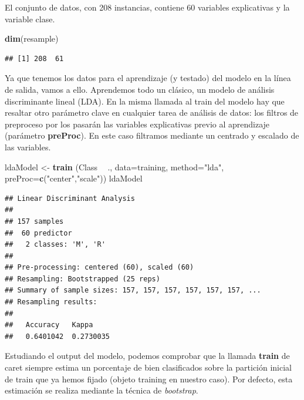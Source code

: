 \documentclass[
]{article}
\newenvironment{Shaded}{\begin{snugshade}}{\end{snugshade}}
\newcommand{\DataTypeTok}[1]{\textcolor[rgb]{0.13,0.29,0.53}{#1}}
\newcommand{\KeywordTok}[1]{\textcolor[rgb]{0.13,0.29,0.53}{\textbf{#1}}}
\newcommand{\NormalTok}[1]{#1}
\newcommand{\OperatorTok}[1]{\textcolor[rgb]{0.81,0.36,0.00}{\textbf{#1}}}
\newcommand{\StringTok}[1]{\textcolor[rgb]{0.31,0.60,0.02}{#1}}
\begin{document}
El conjunto de datos, con 208 instancias, contiene 60 variables
explicativas y la variable clase.

\begin{Shaded}
\begin{Highlighting}[]
\KeywordTok{dim}\NormalTok{(resample)}
\end{Highlighting}
\end{Shaded}

\begin{verbatim}
## [1] 208  61
\end{verbatim}

Ya que tenemos los datos para el aprendizaje (y testado) del modelo en
la línea de salida, vamos a ello. Aprendemos todo un clásico, un modelo
de análisis discriminante lineal (LDA). En la misma llamada al train del
modelo hay que resaltar otro parámetro clave en cualquier tarea de
análisis de datos: los filtros de preproceso por los pasarán las
variables explicativas previo al aprendizaje (parámetro
\textbf{preProc}). En este caso filtramos mediante un centrado y
escalado de las variables.

\begin{Shaded}
\begin{Highlighting}[]
\NormalTok{ldaModel <-}\StringTok{ }\KeywordTok{train}\NormalTok{ (Class }\OperatorTok{~}\StringTok{ }\NormalTok{., }\DataTypeTok{data=}\NormalTok{training, }\DataTypeTok{method=}\StringTok{"lda"}\NormalTok{, }\DataTypeTok{preProc=}\KeywordTok{c}\NormalTok{(}\StringTok{"center"}\NormalTok{,}\StringTok{"scale"}\NormalTok{))}
\NormalTok{ldaModel}
\end{Highlighting}
\end{Shaded}

\begin{verbatim}
## Linear Discriminant Analysis 
## 
## 157 samples
##  60 predictor
##   2 classes: 'M', 'R' 
## 
## Pre-processing: centered (60), scaled (60) 
## Resampling: Bootstrapped (25 reps) 
## Summary of sample sizes: 157, 157, 157, 157, 157, 157, ... 
## Resampling results:
## 
##   Accuracy   Kappa    
##   0.6401042  0.2730035
\end{verbatim}

Estudiando el output del modelo, podemos comprobar que la llamada
\textbf{train} de caret siempre estima un porcentaje de bien
clasificados sobre la partición inicial de train que ya hemos fijado
(objeto training en nuestro caso). Por defecto, esta estimación se
realiza mediante la técnica de \emph{bootstrap}.
\end{document}
